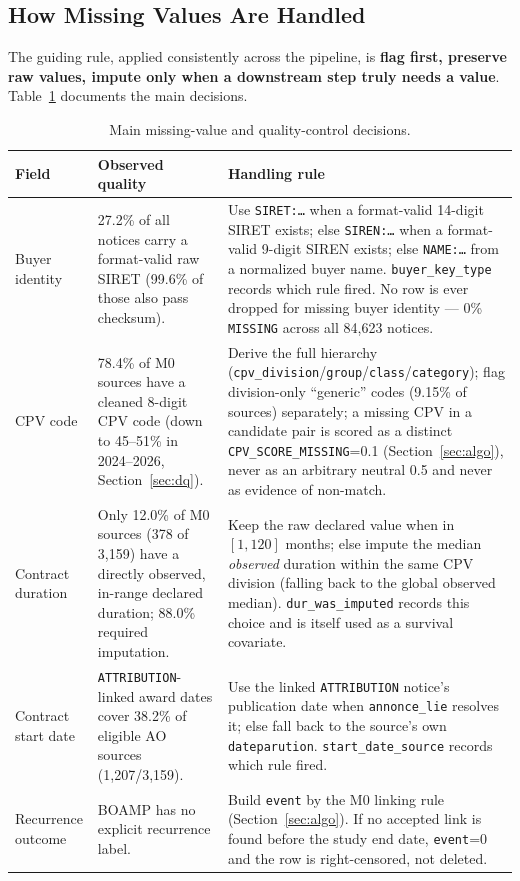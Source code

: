 \documentclass[11pt]{article}
\begin{document}
\subsection{How Missing Values Are Handled}
The guiding rule, applied consistently across the pipeline, is
\textbf{flag first, preserve raw values, impute only when a downstream
step truly needs a value}. Table~\ref{tab:missing} documents the main
decisions.

\begin{table}[h!]
\centering
\caption{Main missing-value and quality-control decisions.}
\label{tab:missing}
\small
\begin{tabular}{p{}p{}p{}}
\toprule
Field & Observed quality & Handling rule \\
\midrule
Buyer identity & 27.2\% of all notices carry a format-valid raw SIRET (99.6\% of those also pass checksum). & Use \texttt{SIRET:\ldots} when a format-valid 14-digit SIRET exists; else \texttt{SIREN:\ldots} when a format-valid 9-digit SIREN exists; else \texttt{NAME:\ldots} from a normalized buyer name. \texttt{buyer\_key\_type} records which rule fired. No row is ever dropped for missing buyer identity --- 0\% \texttt{MISSING} across all 84{,}623 notices. \\
CPV code & 78.4\% of M0 sources have a cleaned 8-digit CPV code (down to 45--51\% in 2024--2026, Section~\ref{sec:dq}). & Derive the full hierarchy (\texttt{cpv\_division}/\texttt{group}/\texttt{class}/\texttt{category}); flag division-only ``generic'' codes (9.15\% of sources) separately; a missing CPV in a candidate pair is scored as a distinct \texttt{CPV\_SCORE\_MISSING}=0.1 (Section~\ref{sec:algo}), never as an arbitrary neutral 0.5 and never as evidence of non-match. \\
Contract duration & Only 12.0\% of M0 sources (378 of 3{,}159) have a directly observed, in-range declared duration; 88.0\% required imputation. & Keep the raw declared value when in $[1,120]$ months; else impute the median \emph{observed} duration within the same CPV division (falling back to the global observed median). \texttt{dur\_was\_imputed} records this choice and is itself used as a survival covariate. \\
Contract start date & \texttt{ATTRIBUTION}-linked award dates cover 38.2\% of eligible AO sources (1{,}207/3{,}159). & Use the linked \texttt{ATTRIBUTION} notice's publication date when \texttt{annonce\_lie} resolves it; else fall back to the source's own \texttt{dateparution}. \texttt{start\_date\_source} records which rule fired. \\
Recurrence outcome & BOAMP has no explicit recurrence label. & Build \texttt{event} by the M0 linking rule (Section~\ref{sec:algo}). If no accepted link is found before the study end date, \texttt{event}=0 and the row is right-censored, not deleted. \\
\bottomrule
\end{tabular}
\end{table}
\end{document}
